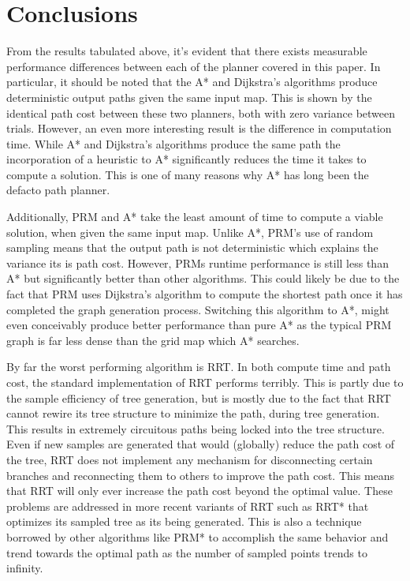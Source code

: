 \section{Conclusions}

From the results tabulated above, it's evident that there exists measurable performance differences between each of the planner covered in this paper. In particular, it should be noted that the A* and Dijkstra's algorithms produce deterministic output paths given the same input map. This is shown by the identical path cost between these two planners, both with zero variance between trials. However, an even more interesting result is the difference in computation time. While A* and Dijkstra's algorithms produce the same path the incorporation of a heuristic to A* significantly reduces the time it takes to compute a solution. This is one of many reasons why A* has long been the defacto path planner.

Additionally, PRM and A* take the least amount of time to compute a viable solution, when given the same input map. Unlike A*, PRM's use of random sampling means that the output path is not deterministic which explains the variance its is path cost. However, PRMs runtime performance is still less than A* but significantly better than other algorithms. This could likely be due to the fact that PRM uses Dijkstra's algorithm to compute the shortest path once it has completed the graph generation process. Switching this algorithm to A*, might even conceivably produce better performance than pure A* as the typical PRM graph is far less dense than the grid map which A* searches. 

By far the worst performing algorithm is RRT. In both compute time and path cost, the standard implementation of RRT performs terribly. This is partly due to the sample efficiency of tree generation, but is mostly due to the fact that RRT cannot rewire its tree structure to minimize the path, during tree generation. This results in extremely circuitous paths being locked into the tree structure. Even if new samples are generated that would (globally) reduce the path cost of the tree, RRT does not implement any mechanism for disconnecting certain branches and reconnecting them to others to improve the path cost. This means that RRT will only ever increase the path cost beyond the optimal value. These problems are addressed in more recent variants of RRT such as RRT* that optimizes its sampled tree as its being generated. This is also a technique borrowed by other algorithms like PRM* to accomplish the same behavior and trend towards the optimal path as the number of sampled points trends to infinity. 